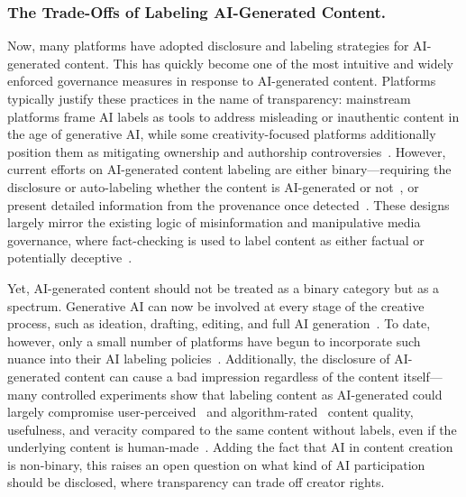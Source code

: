 \subsubsection{The Trade-Offs of Labeling AI-Generated Content.}
\label{subsubsec:labelingtradeoff}
Now, many platforms have adopted disclosure and labeling strategies for AI-generated content. This has quickly become one of the most intuitive and widely enforced governance measures in response to AI-generated content. Platforms typically justify these practices in the name of transparency: mainstream platforms frame AI labels as tools to address misleading or inauthentic content in the age of generative AI, while some creativity-focused platforms additionally position them as mitigating ownership and authorship controversies~\cite{gao2026governance}. However, current efforts on AI-generated content labeling are either binary---requiring the disclosure or auto-labeling whether the content is AI-generated or not~\cite{gao2026governance}, or present detailed information from the provenance once detected~\cite{feng2023examining}. These designs largely mirror the existing logic of misinformation and manipulative media governance, where fact-checking is used to label content as either factual or potentially deceptive~\cite{martel2024fact, martel2023misinformation}.

Yet, AI-generated content should not be treated as a binary category but as a spectrum. Generative AI can now be involved at every stage of the creative process, such as ideation, drafting, editing, and full AI generation~\cite{moruzzi2025content, kim2024unlocking}. To date, however, only a small number of platforms have begun to incorporate such nuance into their AI labeling policies~\cite{gao2026governance}. Additionally, the disclosure of AI-generated content can cause a bad impression regardless of the content itself---many controlled experiments show that labeling content as AI-generated could largely compromise user-perceived~\cite{moruzzi2025content, cheong2025penalizing, chen2025ai} and algorithm-rated~\cite{cheong2025penalizing} content quality, usefulness, and veracity compared to the same content without labels, even if the underlying content is human-made~\cite{altay2024people}. Adding the fact that AI in content creation is non-binary, this raises an open question on what kind of AI participation should be disclosed, where transparency can trade off creator rights. 

